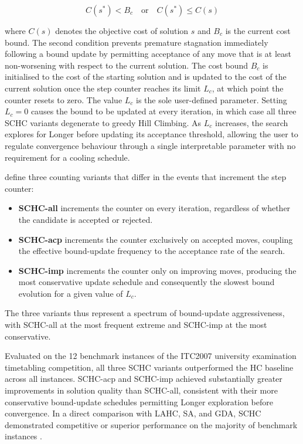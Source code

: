 \documentclass[12pt, a4paper, oneside]{report}
\begin{document}
\begin{equation}
    \label{eq:schc_accept}
    C(s^*) < B_c \quad \text{or} \quad C(s^*) \leq C(s)
\end{equation}

\noindent where $C(s)$ denotes the objective cost of solution $s$ and
$B_c$ is the current cost bound. The second condition prevents
premature stagnation immediately following a bound update by
permitting acceptance of any move that is at least non-worsening with
respect to the current solution. The cost bound $B_c$ is initialised
to the cost of the starting solution and is updated to the cost of
the current solution once the step counter reaches its limit $L_c$,
at which point the counter resets to zero. The value $L_c$ is the
sole user-defined parameter. Setting $L_c = 0$ causes the bound to
be updated at every iteration, in which case all three SCHC variants
degenerate to greedy Hill Climbing. As $L_c$ increases, the search
explores for Longer before updating its acceptance threshold,
allowing the user to regulate convergence behaviour through a single
interpretable parameter with no requirement for a cooling schedule.

\citet{Bykov2016} define three counting variants that differ in the
events that increment the step counter: 

\begin{itemize}
    \item \textbf{SCHC-all} increments
the counter on every iteration, regardless of whether the candidate
is accepted or rejected.
    \item \textbf{SCHC-acp} increments the counter
exclusively on accepted moves, coupling the effective bound-update
frequency to the acceptance rate of the search.
    \item \textbf{SCHC-imp} increments the counter only on improving moves, producing the most
conservative update schedule and consequently the slowest bound
evolution for a given value of $L_c$.
\end{itemize}

The three variants thus
represent a spectrum of bound-update aggressiveness, with SCHC-all at
the most frequent extreme and SCHC-imp at the most conservative.

Evaluated on the 12 benchmark instances of the ITC2007 university
examination timetabling competition, all three SCHC variants
outperformed the HC baseline across all instances. SCHC-acp and
SCHC-imp achieved substantially greater improvements in solution
quality than SCHC-all, consistent with their more conservative
bound-update schedules permitting Longer exploration before
convergence. In a direct comparison with LAHC, SA, and GDA, SCHC
demonstrated competitive or superior performance on the majority of
benchmark instances \citet{Bykov2016}.
\end{document}
